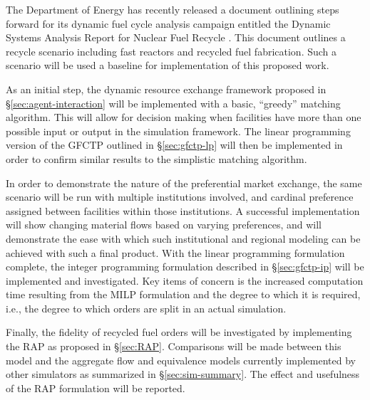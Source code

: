 The Department of Energy has recently released a document outlining steps forward
for its dynamic fuel cycle analysis campaign entitled the Dynamic Systems
Analysis Report for Nuclear Fuel Recycle \cite{dixon_dynamic_2008}. This
document outlines a recycle scenario including fast reactors and recycled fuel
fabrication. Such a scenario will be used a baseline for implementation of this
proposed work.

As an initial step, the dynamic resource exchange framework proposed in
\S\ref{sec:agent-interaction} will be implemented with a basic, ``greedy''
matching algorithm. This will allow for decision making when facilities have
more than one possible input or output in the \Cyclus simulation framework. The
linear programming version of the GFCTP outlined in \S\ref{sec:gfctp-lp} will
then be implemented in order to confirm similar results to the simplistic
matching algorithm. 

In order to demonstrate the nature of the preferential market exchange, the same
scenario will be run with multiple institutions involved, and cardinal
preference assigned between facilities within those institutions. A successful
implementation will show changing material flows based on varying preferences,
and will demonstrate the ease with which such institutional and regional
modeling can be achieved with such a final product. With the linear programming
formulation complete, the integer programming formulation described in
\S\ref{sec:gfctp-ip} will be implemented and investigated. Key items of concern
is the increased computation time resulting from the MILP formulation and the
degree to which it is required, i.e., the degree to which orders are split in an
actual simulation. 

Finally, the fidelity of recycled fuel orders will be investigated by
implementing the RAP as proposed in \S\ref{sec:RAP}. Comparisons will be made
between this model and the aggregate flow and equivalence models currently
implemented by other simulators as summarized in \S\ref{sec:sim-summary}. The
effect and usefulness of the RAP formulation will be reported.
